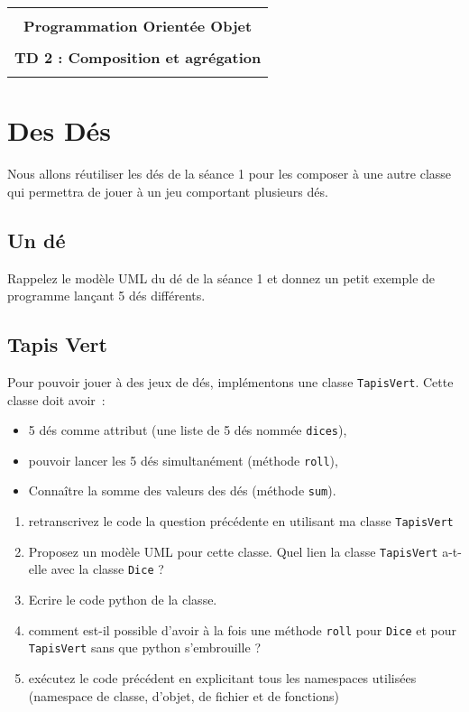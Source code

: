 \documentclass[12pt]{article}
\begin{document}
    \begin{center}
      \begin{tabular}{c}
      \hline
    \\
        {\bf \textsf {\Large Programmation Orientée Objet}}\\
    \\
        {\bf \textsf {\Large TD 2 : Composition et agrégation}}\\
    \\
        \hline
      \end{tabular}
    \end{center}
    \vspace{15mm}

\section{Des Dés}

Nous allons réutiliser les dés de la séance 1 pour les composer à une autre classe qui permettra de jouer à un jeu comportant plusieurs dés.

\subsection{Un dé}

Rappelez le modèle UML du dé de la séance 1 et donnez un petit exemple de programme lançant 5 dés différents.


\subsection{Tapis Vert}

Pour pouvoir jouer à des jeux de dés, implémentons une classe
\verb|TapisVert|. Cette classe doit avoir~:
\begin{itemize}
	\item 5 dés comme attribut (une liste de 5 dés nommée \verb|dices|),
	\item pouvoir lancer les 5 dés simultanément (méthode \verb|roll|),
	\item Connaître la somme des valeurs des dés (méthode \verb|sum|).
\end{itemize}

\begin{enumerate}
    \item retranscrivez le code la question précédente en utilisant ma classe \verb|TapisVert|
    \item Proposez un modèle UML pour cette classe. Quel lien la classe \verb|TapisVert| a-t-elle avec la classe \verb|Dice| ?
    \item Ecrire le code python de la classe.
    \item comment est-il possible d'avoir à la fois une méthode \verb|roll| pour \verb|Dice| et pour \verb|TapisVert| sans que python s'embrouille ?
    \item exécutez le code précédent en explicitant tous les namespaces utilisées (namespace de classe, d'objet, de fichier et de fonctions)
\end{enumerate}
\end{document}
